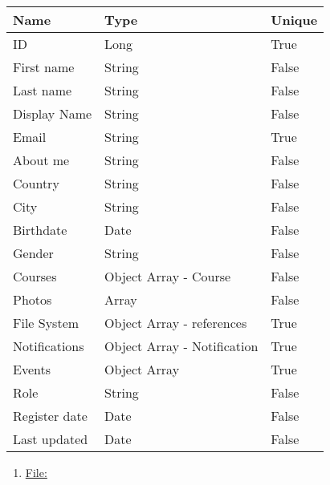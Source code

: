 \documentclass[12pt,a4paper]{article}
\begin{document}
    \begin{table}[h]
        \centering
        \begin{tabular}{|l|l|l|}
            \hline
            \textbf{Name} & \textbf{Type} & \textbf{Unique} \\
            \hline
            ID & Long & True \\
            \hline
            First name & String & False \\
            \hline
            Last name & String & False \\
            \hline
            Display Name & String & False \\
            \hline
            Email & String & True \\
            \hline
            About me & String & False \\
            \hline
            Country & String & False \\
            \hline
            City & String & False \\
            \hline
            Birthdate & Date & False \\
            \hline
            Gender & String & False \\
            \hline
            Courses & Object Array - Course & False \\
            \hline
            Photos & Array & False \\
            \hline
            File System & Object Array - references & True \\
            \hline
            Notifications & Object Array - Notification & True \\
            \hline
            Events & Object Array & True \\
            \hline
            Role & String & False \\
            \hline
            Register date & Date & False \\
            \hline
            Last updated & Date & False \\
            \hline
        \end{tabular}
    \end{table}


    \newpage




    \begin{enumerate}
        \setcounter{enumi}{\thenumberedCntBA}
        \item \underline{File:}
        \setcounter{numberedCntBA}{\theenumi}
    \end{enumerate}
\end{document}
